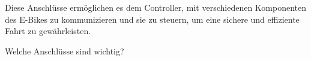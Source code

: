 Diese Anschlüsse ermöglichen es dem Controller, mit verschiedenen Komponenten des E-Bikes zu kommunizieren und sie zu steuern, um eine sichere und effiziente Fahrt zu gewährleisten.

Welche Anschlüsse sind wichtig?
